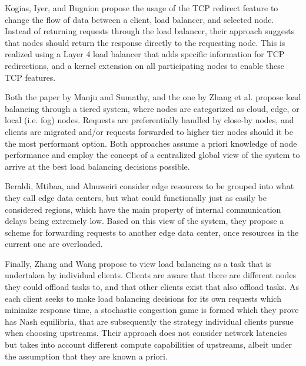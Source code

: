 Kogias, Iyer, and Bugnion propose the usage of the TCP redirect feature to change the flow of data between a client, load balancer, and selected node\cite{kogiasBypassingLoadBalancer2020}.
Instead of returning requests through the load balancer, their approach suggests that nodes should return the response directly to the requesting node.
This is realized using a Layer 4 load balancer that adds specific information for TCP redirections, and a kernel extension on all participating nodes to enable these TCP features.

Both the paper by Manju and Sumathy\cite{manjuEfficientLoadBalancing2019}, and the one by Zhang et al. \cite{zhangSecureOptimizedLoad2021} propose load balancing through a tiered system, where nodes are categorized as cloud, edge, or local (i.e. fog) nodes.
Requests are preferentially handled by close-by nodes, and clients are migrated and/or requests forwarded to higher tier nodes should it be the most performant option.
Both approaches assume a priori knowledge of node performance and employ the concept of a centralized global view of the system to arrive at the best load balancing decisions possible.

Beraldi, Mtibaa, and Alnuweiri\cite{beraldiCooperativeLoadBalancing2017} consider edge resources to be grouped into what they call edge data centers, but what could functionally just as easily be considered regions, which have the main property of internal communication delays being extremely low.
Based on this view of the system, they propose a scheme for forwarding requests to another edge data center, once resources in the current one are overloaded.

Finally, Zhang and Wang\cite{zhangStochasticCongestionGame2021} propose to view load balancing as a task that is undertaken by individual clients.
Clients are aware that there are different nodes they could offload tasks to, and that other clients exist that also offload tasks.
As each client seeks to make load balancing decisions for its own requests which minimize response time, a stochastic congestion game is formed\cite{zhangStochasticCongestionGame2021} which they prove has Nash equilibria, that are subsequently the strategy individual clients pursue when choosing upstreams.
Their approach does not consider network latencies but takes into account different compute capabilities of upstreams, albeit under the assumption that they are known a priori.

